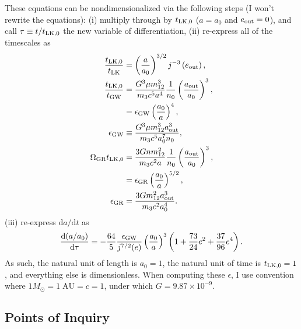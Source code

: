 \documentclass[11pt,
        usenames, %
        dvipsnames %
    ]{article}
\newcommand*{\rd}[2]{\frac{\mathrm{d}#1}{\mathrm{d}#2}}
\newcommand*{\rdil}[2]{\mathrm{d}#1 / \mathrm{d}#2}
\newcommand*{\p}[1]{\left(#1\right)}
\begin{document}
These equations can be nondimensionalized via the following steps (I won't
rewrite the equations): (i) multiply through by $t_{\rm LK, 0}$ ($a = a_0$ and
$e_{\rm out} = 0$), and call $\tau \equiv t / t_{\rm LK, 0}$ the new variable of
differentiation, (ii) re-express all of the timescales as
\begin{align}
    \frac{t_{\rm LK, 0}}{t_{\rm LK}} &= \p{\frac{a}{a_0}}^{3/2}
        j^{-3}\p{e_{\rm out}},\\
    \frac{t_{\rm LK, 0}}{t_{\rm GW}} &=
        \frac{G^3\mu m_{12}^3}{m_3c^5a^4}\frac{1}{n_0}\p{\frac{a_{\rm out}
            }{a_0}}^3,\nonumber\\
        &= \epsilon_{\rm GW}\p{\frac{a_0}{a}}^4,\\
    \epsilon_{\rm GW} &\equiv \frac{G^3\mu m_{12}^3
        a_{\rm out}^3}{m_3c^5a_0^7 n_0},\\
    \Omega_{\rm GR}t_{\rm LK, 0} &= \frac{3Gnm_{12}^2}{m_3c^2a}
        \frac{1}{n_0}\p{\frac{a_{\rm out}}{a_0}}^3,\nonumber\\
        &= \epsilon_{\rm GR} \p{\frac{a_0}{a}}^{5/2},\\
    \epsilon_{\rm GR} &= \frac{3Gm_{12}^2a_{\rm out}^3}{m_3c^2a_0^4}.
\end{align}
(iii) re-express $\rdil{a}{t}$ as
\begin{equation}
    \rd{(a / a_0)}{\tau} = -\frac{64}{5}\frac{\epsilon_{\rm GW}}{
        j^{7/2}(e)}\p{\frac{a_0}{a}}^3\p{1 + \frac{73}{24}e^2 +
        \frac{37}{96}e^4}.
\end{equation}
As such, the natural unit of length is $a_0 = 1$, the natural unit of time is
$t_{\rm LK, 0} = 1$, and everything else is dimensionless. When computing these
$\epsilon$, I use convention where $1 M_{\odot} = 1\;\mathrm{AU} = c = 1$, under
which $G = 9.87 \times 10^{-9}$.

\subsection{Points of Inquiry}
\end{document}
